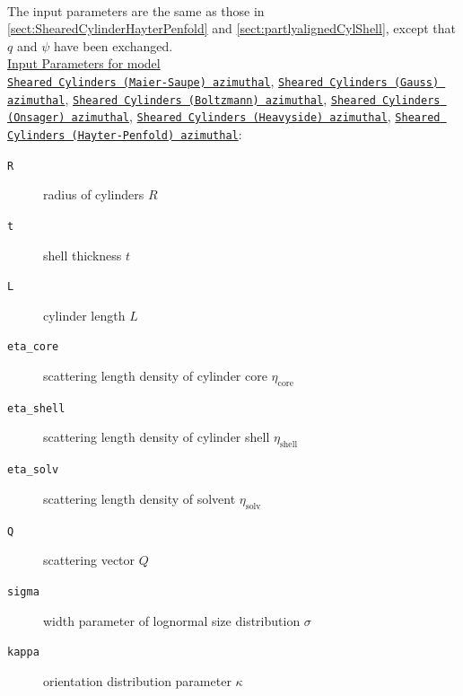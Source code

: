 \hspace{1pt}\\
The input parameters are the same as those in \ref{sect:ShearedCylinderHayterPenfold} and \ref{sect:partlyalignedCylShell}, except that $q$ and $\psi$ have been exchanged.\\
\underline{Input Parameters for model}\\ \underline{\texttt{Sheared Cylinders (Maier-Saupe) azimuthal}}, \underline{\texttt{Sheared Cylinders (Gauss) azimuthal}}, \underline{\texttt{Sheared Cylinders (Boltzmann) azimuthal}}, \underline{\texttt{Sheared Cylinders (Onsager) azimuthal}}, \underline{\texttt{Sheared Cylinders (Heavyside) azimuthal}}, \underline{\texttt{Sheared Cylinders (Hayter-Penfold) azimuthal}}:\\
\begin{description}
\item[\texttt{R}] radius of cylinders $R$
\item[\texttt{t}] shell thickness $t$
\item[\texttt{L}] cylinder length $L$
\item[\texttt{eta\_core}] scattering length density of cylinder core $\eta_\mathrm{core}$
\item[\texttt{eta\_shell}] scattering length density of cylinder shell $\eta_\mathrm{shell}$
\item[\texttt{eta\_solv}] scattering length density of solvent $\eta_\mathrm{solv}$
\item[\texttt{Q}] scattering vector $Q$
\item[{\texttt{sigma}}] width parameter of lognormal size distribution $\sigma$
\item[{\texttt{kappa}}] orientation distribution parameter $\kappa$
\end{description}

\vspace{5mm}

